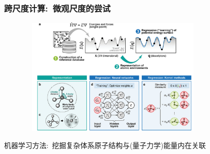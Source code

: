 \frame
{
	\frametitle{跨尺度计算:~微观尺度的尝试}
\begin{figure}[h!]
\vspace*{-0.15in}
\centering
\includegraphics[height=2.25in,width=3.65in,viewport=0 0 1215 822,clip]{Figures/Schematic-illustration-machine_learning_algorithm-to-find-the-relationship-of-the-atomic_configuration-and-energy.png}
\label{Schematic-illustration-machine_learning_algorithm-to-find-the-relationship-of-the-atomic_configuration-and-energy}
\end{figure}
机器学习方法:~挖掘复杂体系原子结构与(量子力学)能量内在关联
}

